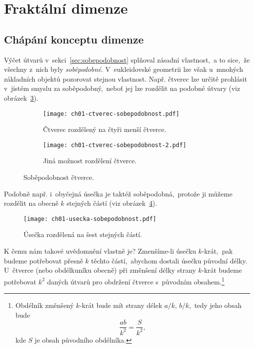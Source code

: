 \section{Fraktální dimenze}\label{sec:fraktalni_dimenze}

\subsection{Chápání konceptu dimenze}\label{subsec:koncept-dimenze}

Výčet útvarů v~sekci~\ref{sec:sobepodobnost} splňoval zásadní vlastnost,~a to sice,~že všechny z~nich byly \emph{soběpodobné}. V~eukleidovské geometrii lze však u~mnohých základních objektů pozorovat stejnou vlastnost. Např. čtverec lze určitě prohlásit v~jistém smyslu za soběpodobný,~neboť jej lze rozdělit na podobné útvary (viz obrázek~\ref{fig:sobepodobnost-ctverce}).
\begin{figure}[h]
    \centering
    \begin{subfigure}[b]{\subfigwidth}
        \centering
        \texttt{[image: ch01-ctverec-sobepodobnost.pdf]}
        \caption{Čtverec rozdělený na čtyři menší čtverce.}
        \label{subfig:sobepodobnost-ctverce-1}
    \end{subfigure}
    \begin{subfigure}[b]{\subfigwidth}
        \centering
        \texttt{[image: ch01-ctverec-sobepodobnost-2.pdf]}
        \caption{Jiná možnost rozdělení čtverce.}
        \label{subfig:sobepodobnost-ctverce-2}
    \end{subfigure}
    \caption{Soběpodobnost čtverce.}
    \label{fig:sobepodobnost-ctverce}
\end{figure}
Podobně např. i~obyčejná úsečka je taktéž soběpodobná,~protože ji můžeme rozdělit na obecně $k$ stejných částí (viz obrázek~\ref*{fig:sobepodobnost-usecky}).\par
\begin{figure}[h]
    \centering
    \texttt{[image: ch01-usecka-sobepodobnost.pdf]}
    \caption{Úsečka rozdělená na šest stejných částí.}
    \label{fig:sobepodobnost-usecky}
\end{figure}
K čemu nám takové uvědomnění vlastně je? Zmenšíme-li úsečku $k$-krát,~pak budeme potřebovat přesně $k$ těchto částí,~abychom dostali úsečku původní délky. U~čtverce (nebo obdélkuníku obecně) při změnšení délky strany $k$-krát budeme potřebovat $k^2$ daných útvarů pro obdržení čtverce s~původním obsahem.\footnote{Obdélník změnšený $k$-krát bude mít strany délek $a/k,\,b/k$,~tedy jeho obsah bude
\[\dfrac{ab}{k^2}=\dfrac{S}{k^2},\]
kde $S$ je obsah původního obdélníka.}
